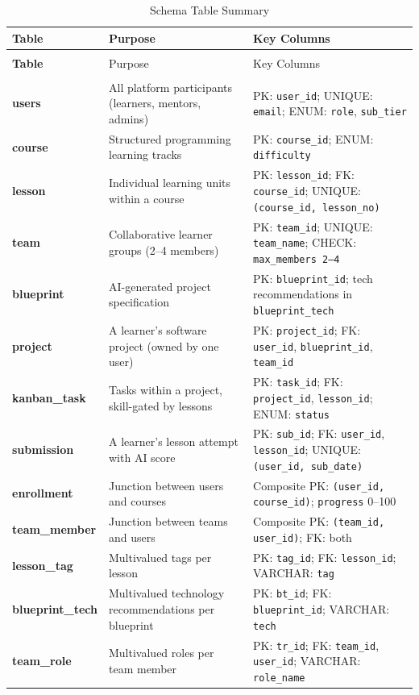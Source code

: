 \documentclass[12pt,a4paper]{article}
\begin{document}
\begin{longtable}{>{\bfseries}p{3.2cm} p{5cm} p{5.5cm}}
\caption{Schema Table Summary}
\label{tab:schema} \\
\toprule
Table & Purpose & Key Columns \\
\midrule
\endfirsthead
\multicolumn{3}{c}{\tablename\ \thetable{} -- continued} \\
\toprule
Table & Purpose & Key Columns \\
\midrule
\endhead
\midrule
\multicolumn{3}{r}{Continued on next page\ldots} \\
\endfoot
\bottomrule
\endlastfoot
users & All platform participants (learners, mentors, admins) &
    PK: \texttt{user\_id}; UNIQUE: \texttt{email}; ENUM: \texttt{role}, \texttt{sub\_tier} \\[4pt]
course & Structured programming learning tracks &
    PK: \texttt{course\_id}; ENUM: \texttt{difficulty} \\[4pt]
lesson & Individual learning units within a course &
    PK: \texttt{lesson\_id}; FK: \texttt{course\_id}; UNIQUE: \texttt{(course\_id, lesson\_no)} \\[4pt]
team & Collaborative learner groups (2--4 members) &
    PK: \texttt{team\_id}; UNIQUE: \texttt{team\_name}; CHECK: \texttt{max\_members 2--4} \\[4pt]
blueprint & AI-generated project specification &
    PK: \texttt{blueprint\_id}; tech recommendations in \texttt{blueprint\_tech} \\[4pt]
project & A learner's software project (owned by one user) &
    PK: \texttt{project\_id}; FK: \texttt{user\_id}, \texttt{blueprint\_id}, \texttt{team\_id} \\[4pt]
kanban\_task & Tasks within a project, skill-gated by lessons &
    PK: \texttt{task\_id}; FK: \texttt{project\_id}, \texttt{lesson\_id}; ENUM: \texttt{status} \\[4pt]
submission & A learner's lesson attempt with AI score &
    PK: \texttt{sub\_id}; FK: \texttt{user\_id}, \texttt{lesson\_id}; UNIQUE: \texttt{(user\_id, sub\_date)} \\[4pt]
enrollment & Junction between users and courses &
    Composite PK: \texttt{(user\_id, course\_id)}; \texttt{progress} 0--100 \\[4pt]
team\_member & Junction between teams and users &
    Composite PK: \texttt{(team\_id, user\_id)}; FK: both \\[4pt]
lesson\_tag & Multivalued tags per lesson &
    PK: \texttt{tag\_id}; FK: \texttt{lesson\_id}; VARCHAR: \texttt{tag} \\[4pt]
blueprint\_tech & Multivalued technology recommendations per blueprint &
    PK: \texttt{bt\_id}; FK: \texttt{blueprint\_id}; VARCHAR: \texttt{tech} \\[4pt]
team\_role & Multivalued roles per team member &
    PK: \texttt{tr\_id}; FK: \texttt{team\_id}, \texttt{user\_id}; VARCHAR: \texttt{role\_name} \\[4pt]
\end{longtable}
\end{document}

